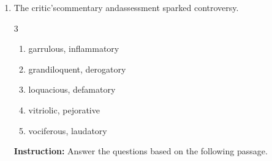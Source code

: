 \documentclass[12pt]{article}
\begin{document}
\begin{enumerate}[label=\textbf{\arabic*.}]
\item The critic's\underline{\hspace{2cm}}commentary and\underline{\hspace{2cm}}assessment sparked controversy.

\begin{multicols}{3}

\begin{enumerate}[label=(\Alph*)]

\item garrulous, inflammatory

\item grandiloquent, derogatory

\item loquacious, defamatory

\item vitriolic, pejorative

\item vociferous, laudatory

\end{enumerate}

\end{multicols}
\noindent\textbf{Instruction:} Answer the questions based on the following passage.


\end{enumerate}
\end{document}
